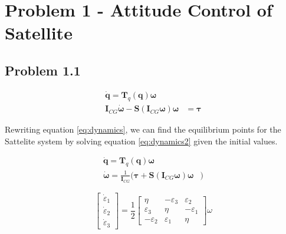 \section*{Problem 1 - Attitude Control of Satellite}



\subsection*{Problem 1.1} 

\begin{equation}
\label{eq:dynamics}		%
	\begin{aligned}
		\dot{\mathbf{q}} = \mathbf{T}_q (\mathbf{q} ) \boldsymbol{\omega} \\
		\mathbf{I}_{CG} \dot{\boldsymbol{\omega}} - \mathbf{S} (\mathbf{I}_{CG} \boldsymbol{\omega} ) \boldsymbol{\omega} & =  \boldsymbol{\tau}
	\end{aligned}	
\end{equation}

Rewriting equation \ref{eq:dynamics}, we can find the equilibrium points for the Sattelite system by solving equation \ref{eq:dynamics2} given the  initial values. 

\begin{equation}
\label{eq:dynamics2}		%
	\begin{aligned}
		\dot{\mathbf{q}} = \mathbf{T}_q (\mathbf{q} ) \boldsymbol{\omega} \\
		\dot{\boldsymbol{\omega}} =  \frac{1}{\mathbf{I}_{CG}} (\boldsymbol{\tau} + \mathbf{S} (\mathbf{I}_{CG} \boldsymbol{\omega} ) \boldsymbol{\omega} &)
	\end{aligned}	
\end{equation}

\begin{equation}
    \begin{bmatrix}
        \dot{\varepsilon}_1 \\ \dot{\varepsilon}_2 \\ \dot{\varepsilon}_3
    \end{bmatrix}
    = \frac{1}{2}
      \begin{bmatrix}
        \eta & -\varepsilon_3 & \varepsilon_2 \\ \varepsilon_3 & \eta & - \varepsilon_1 \\ -\varepsilon_2 & \varepsilon_1 & \eta
    \end{bmatrix} 
    \omega
\end{equation}

